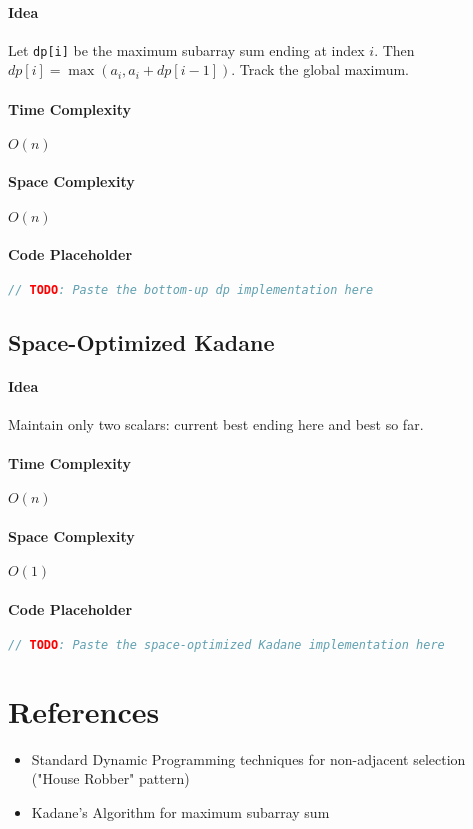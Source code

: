 \documentclass[11pt,a4paper]{article}
\begin{document}
\paragraph{Idea} Let \texttt{dp[i]} be the maximum subarray sum ending at index \(i\). Then \(dp[i] = \max(a_i, a_i + dp[i-1])\). Track the global maximum.

\paragraph{Time Complexity} \(O(n)\)

\paragraph{Space Complexity} \(O(n)\)

\paragraph{Code Placeholder}
\begin{lstlisting}[language=C++, caption={q2: Bottom-Up DP (Kadane via dp array)}, label={lst:q2-tab}]
// TODO: Paste the bottom-up dp implementation here
\end{lstlisting}

\subsection{Space-Optimized Kadane}
\paragraph{Idea} Maintain only two scalars: current best ending here and best so far.

\paragraph{Time Complexity} \(O(n)\)

\paragraph{Space Complexity} \(O(1)\)

\paragraph{Code Placeholder}
\begin{lstlisting}[language=C++, caption={q2: Space-Optimized Kadane}, label={lst:q2-iter}]
// TODO: Paste the space-optimized Kadane implementation here
\end{lstlisting}

\section{References}
\begin{itemize}[leftmargin=*]
  \item Standard Dynamic Programming techniques for non-adjacent selection ("House Robber" pattern)
  \item Kadane's Algorithm for maximum subarray sum
\end{itemize}
\end{document}
